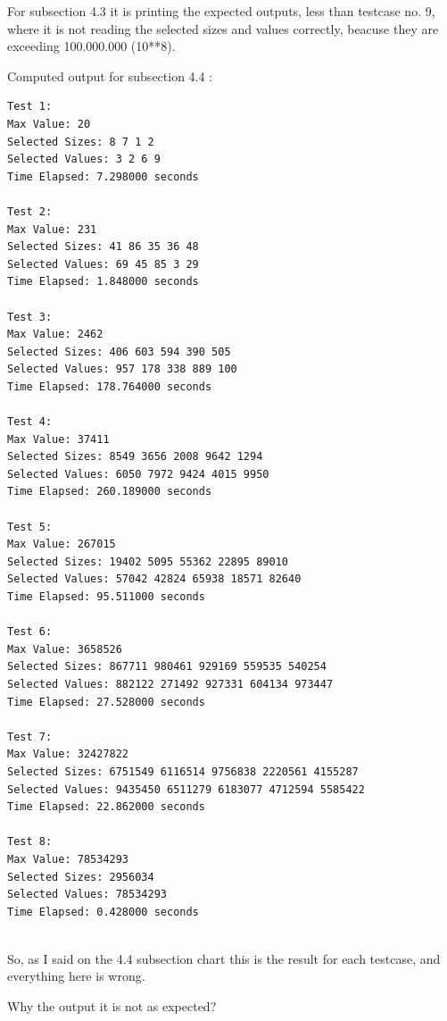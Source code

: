 \documentclass{article}%
\begin{document}
For subsection 4.3 it is printing the expected outputs, less than testcase no. 9, 
where it is not reading the selected sizes and values correctly, 
beacuse they are exceeding 100.000.000 (10**8).
                        
                        
   \vspace*{\fill}

%
\newpage%

 \vspace*{\fill}
Computed output for subsection 4.4 : 
                         
\small
\begin{verbatim}                     
Test 1:
Max Value: 20
Selected Sizes: 8 7 1 2 
Selected Values: 3 2 6 9 
Time Elapsed: 7.298000 seconds
                        
Test 2:
Max Value: 231
Selected Sizes: 41 86 35 36 48 
Selected Values: 69 45 85 3 29 
Time Elapsed: 1.848000 seconds
                        
Test 3:
Max Value: 2462
Selected Sizes: 406 603 594 390 505 
Selected Values: 957 178 338 889 100 
Time Elapsed: 178.764000 seconds
                        
Test 4:
Max Value: 37411
Selected Sizes: 8549 3656 2008 9642 1294 
Selected Values: 6050 7972 9424 4015 9950 
Time Elapsed: 260.189000 seconds
                        
Test 5:
Max Value: 267015
Selected Sizes: 19402 5095 55362 22895 89010 
Selected Values: 57042 42824 65938 18571 82640 
Time Elapsed: 95.511000 seconds
                        
Test 6:
Max Value: 3658526
Selected Sizes: 867711 980461 929169 559535 540254 
Selected Values: 882122 271492 927331 604134 973447 
Time Elapsed: 27.528000 seconds

Test 7:
Max Value: 32427822
Selected Sizes: 6751549 6116514 9756838 2220561 4155287 
Selected Values: 9435450 6511279 6183077 4712594 5585422 
Time Elapsed: 22.862000 seconds

Test 8:
Max Value: 78534293
Selected Sizes: 2956034 
Selected Values: 78534293 
Time Elapsed: 0.428000 seconds
                        
\end{verbatim}


So, as I said on the 4.4 subsection chart this is the result for each testcase, and everything here is wrong.
                        
Why the output it is not as expected?
\end{document}
